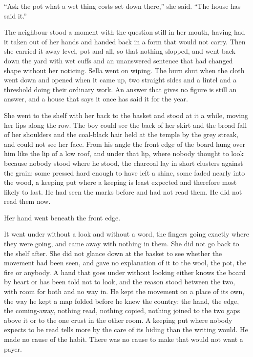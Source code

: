 “Ask the pot what a wet thing costs set down there,” she said. “The house has said it.”

The neighbour stood a moment with the question still in her mouth, having had it taken out of her hands and handed back in a form that would not carry. Then she carried it away level, pot and all, so that nothing slopped, and went back down the yard with wet cuffs and an unanswered sentence that had changed shape without her noticing. Sella went on wiping. The burn shut when the cloth went down and opened when it came up, two straight sides and a lintel and a threshold doing their ordinary work. An answer that gives no figure is still an answer, and a house that says it once has said it for the year.

\scenebreak

She went to the shelf with her back to the basket and stood at it a while, moving her lips along the row. The boy could see the back of her skirt and the broad fall of her shoulders and the coal-black hair held at the temple by the grey streak, and could not see her face. From his angle the front edge of the board hung over him like the lip of a low roof, and under that lip, where nobody thought to look because nobody stood where he stood, the charcoal lay in short clusters against the grain: some pressed hard enough to have left a shine, some faded nearly into the wood, a keeping put where a keeping is least expected and therefore most likely to last. He had seen the marks before and had not read them. He did not read them now.

Her hand went beneath the front edge.

It went under without a look and without a word, the fingers going exactly where they were going, and came away with nothing in them. She did not go back to the shelf after. She did not glance down at the basket to see whether the movement had been seen, and gave no explanation of it to the wool, the pot, the fire or anybody. A hand that goes under without looking either knows the board by heart or has been told not to look, and the reason stood between the two, with room for both and no way in. He kept the movement on a place of its own, the way he kept a map folded before he knew the country: the hand, the edge, the coming-away, nothing read, nothing copied, nothing joined to the two gaps above it or to the one crust in the other room. A keeping put where nobody expects to be read tells more by the care of its hiding than the writing would. He made no cause of the habit. There was no cause to make that would not want a payer.


